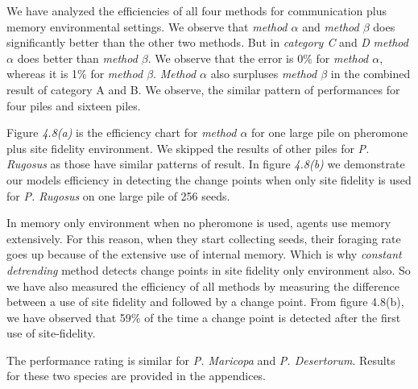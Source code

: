 We have analyzed the efficiencies of all four methods for communication plus memory environmental settings. We observe that \textit{method $\alpha$} and \textit{method $\beta$} does significantly better than the other two methods. But in \textit{category C} and \textit{D} \textit{method $\alpha$} does better than \textit{method $\beta$}. We observe that the error is 0\% for \textit{method $\alpha$}, whereas it is 1\% for \textit{method $\beta$}. \textit{Method $\alpha$} also surpluses \textit{method $\beta$} in the combined result of category A and B. We observe, the similar pattern of performances for four piles and sixteen piles. \par 
Figure \textit{4.8(a)} is the efficiency chart for \textit{method $\alpha$} for one large pile on pheromone plus site fidelity environment. We skipped the results of other piles for \textit{P. Rugosus} as those have similar patterns of result. In figure \textit{4.8(b)} we demonstrate our model\textquotesingle s efficiency in detecting the change points when only site fidelity is used for \textit{P. Rugosus} on one large pile of 256 seeds.\par 
In memory only environment when no pheromone is used, agents use memory extensively. For this reason, when they start collecting seeds, their foraging rate goes up because of the extensive use of internal memory. Which is why \textit{constant detrending} method detects change points in site fidelity only environment also. So we have also measured the efficiency of all methods by measuring the difference between a use of site fidelity and followed by a change point. From figure 4.8(b), we have observed that 59\% of the time a change point is detected after the first use of site-fidelity.\par  
The performance rating is similar for \textit{P. Maricopa} and \textit{P. Desertorum}. Results for these two species are provided in the appendices.
